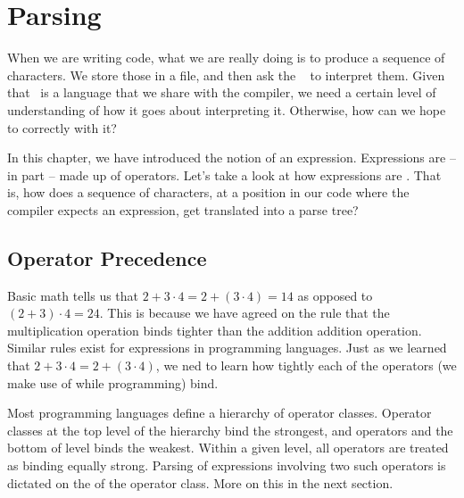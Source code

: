 \section{Parsing}

When we are writing code, what we are really doing is to produce a sequence of characters. We store those in a file, and then ask the \csharp\  to interpret them. Given that \csharp\ is a language that we share with the compiler, we need a certain level of understanding of how it goes about interpreting it. Otherwise, how can we hope to  correctly with it?

In this chapter, we have introduced the notion of an expression. Expressions are -- in part -- made up of operators. Let's take a look at how expressions are . That is, how does a sequence of characters, at a position in our code where the compiler expects an expression, get translated into a parse tree?

\subsection{Operator Precedence}

Basic math tells us that $2+3 \cdot 4=2+(3 \cdot 4)=14$ as opposed to $(2+3) \cdot 4=24$. This is because we have agreed on the rule that the multiplication operation binds tighter than the addition addition operation. Similar rules exist for expressions in programming languages. Just as we learned that $2+3 \cdot 4=2+(3 \cdot 4)$, we ned to learn how tightly each of the operators (we make use of while programming) bind.

Most programming languages define a hierarchy of operator classes. Operator classes at the top level of the hierarchy bind the strongest, and operators and the bottom of level binds the weakest. Within a given level, all operators are treated as binding equally strong. Parsing of expressions involving two such operators is dictated on the  of the operator class. More on this in the next section.

